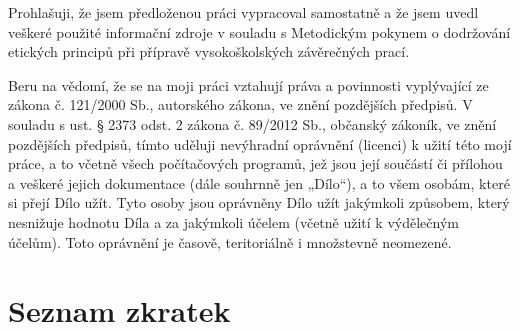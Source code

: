 \documentclass[czech,bachelor,unicode]{ctufit-thesis}
\begin{document}
\begin{declarationpage}
Prohlašuji, že jsem předloženou práci vypracoval samostatně a že jsem uvedl veškeré použité
informační zdroje v souladu s Metodickým pokynem o dodržování etických principů při přípravě
vysokoškolských závěrečných prací.

Beru na vědomí, že se na moji práci vztahují práva a povinnosti vyplývající ze zákona č. 121/2000 Sb.,
autorského zákona, ve znění pozdějších předpisů. V souladu s ust. § 2373 odst. 2 zákona č. 89/2012
Sb., občanský zákoník, ve znění pozdějších předpisů, tímto uděluji nevýhradní oprávnění (licenci) k
užití této mojí práce, a to včetně všech počítačových programů, jež jsou její součástí či přílohou a
veškeré jejich dokumentace (dále souhrnně jen „Dílo“), a to všem osobám, které si přejí Dílo užít. Tyto
osoby jsou oprávněny Dílo užít jakýmkoli způsobem, který nesnižuje hodnotu Díla a za jakýmkoli
účelem (včetně užití k výdělečným účelům). Toto oprávnění je časově, teritoriálně i množstevně
neomezené.
\end{declarationpage}
\newcommand{\term}[1]{{\fontfamily{qcr}\selectfont #1}}
\printabstractpage %
\chapter{Seznam zkratek}

\mainmatter\mainmatterinit %

\appendix\appendixinit %
\backmatter %
\printbibliography %
\end{document}
